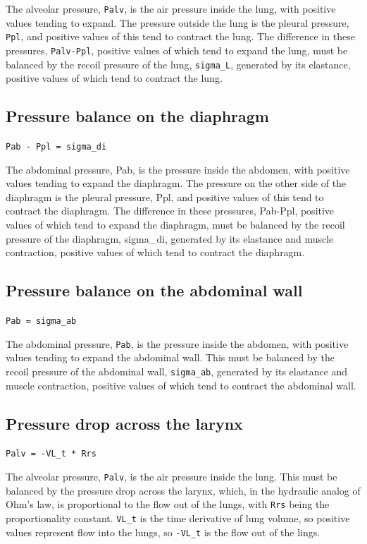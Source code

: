 \documentclass[12pt,openany,oneside]{book}
\newcommand{\ticode}[1]{\texttt{#1}}
\begin{document}
The alveolar pressure, \ticode{Palv}, is the air pressure inside the
lung, with positive values tending to expand. The pressure outside
the lung is the pleural pressure, \ticode{Ppl}, and positive values of
this tend to contract the lung. The difference in these pressures,
\ticode{Palv-Ppl}, positive values of which tend to expand the lung,
must be balanced by the recoil pressure of the lung, \ticode{sigma\_L},
generated by its elastance, positive values of which tend to contract
the lung.

\subsection{Pressure balance on the diaphragm}
\ticode{Pab - Ppl = sigma\_di}

The abdominal pressure, Pab, is the pressure inside the abdomen, with
positive values tending to expand the diaphragm. The pressure on the
other side of the diaphragm is the pleural pressure, Ppl, and positive
values of this tend to contract the diaphragm. The difference in
these pressures, Pab-Ppl, positive values of which tend to expand the
diaphragm, must be balanced by the recoil pressure of the diaphragm,
sigma\_di, generated by its elastance and muscle contraction, positive
values of which tend to contract the diaphragm.

\subsection{Pressure balance on the abdominal wall}
\ticode{Pab = sigma\_ab}

The abdominal pressure, \ticode{Pab}, is the pressure inside the
abdomen, with positive values tending to expand the abdominal wall.
This must be balanced by the recoil pressure of the abdominal wall,
\ticode{sigma\_ab}, generated by its elastance and muscle contraction,
positive values of which tend to contract the abdominal wall.

\subsection{Pressure drop across the larynx}
\ticode{Palv = -VL\_t * Rrs}

The alveolar pressure, \ticode{Palv}, is the air pressure inside the
lung. This must be balanced by the pressure drop across the larynx,
which, in the hydraulic analog of Ohm's law, is proportional to the
flow out of the lungs, with \ticode{Rrs} being the proportionality
constant. \ticode{VL\_t} is the time derivative of lung volume, so
positive values represent flow into the lungs, so \ticode{-VL\_t} is
the flow out of the lings.
\end{document}
